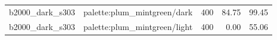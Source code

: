 \begin{longtable}{l>{\raggedright\arraybackslash}p{.42\linewidth}rrr}
b2000\_\allowbreak{}dark\_\allowbreak{}s303 & %
palette:plum\_\allowbreak{}mintgreen/dark & %
400 & %
84.75 & %
99.45 \\ %

b2000\_\allowbreak{}dark\_\allowbreak{}s303 & %
palette:plum\_\allowbreak{}mintgreen/light & %
400 & %
0.00 & %
55.06 \\ %


\end{longtable}

